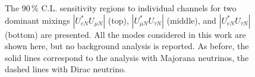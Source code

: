 \begin{figure}
	\centering
	{\resizebox{\linewidth}{!}{}}
	\vspace{0.05em}

	{\resizebox{\linewidth}{!}{}}
	\vspace{0.05em}

	{\resizebox{\linewidth}{!}{}}
	\caption[Sensitivity regions to individual channels for two dominant mixings]%
		{The 90\,\% C.L. sensitivity regions to individual channels for two dominant mixings %
		$|U_{e N}^* U_{\mu N}|$ (top), $|U_{\mu N}^* U_{\tau N}|$ (middle), and $|U_{e N}^* U_{\tau N}|$ (bottom) are presented.
		All the modes considered in this work are shown here, but no background analysis is reported.
		As before, the solid lines correspond to the analysis with Majorana neutrinos, the dashed lines with Dirac neutrino.}
	\label{fig:senseMix}
\end{figure}



